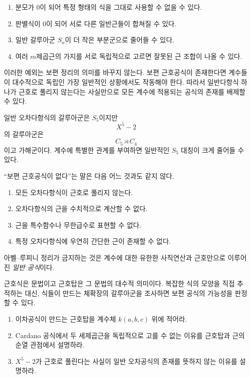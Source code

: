 \begin{enumerate}[label=(\arabic*)]
  \item 분모가 $0$이 되어 특정 형태의 식을 그대로 사용할 수 없을 수 있다.
  \item 판별식이 $0$이 되어 서로 다른 일반근들이 합쳐질 수 있다.
  \item 일반 갈루아군 $S_n$이 더 작은 부분군으로 줄어들 수 있다.
  \item 여러 $m$제곱근의 가지를 서로 독립적으로 고르면 잘못된 근 조합이 나올 수 있다.
\end{enumerate}

이러한 예외는 보편 정리의 의미를 바꾸지 않는다. 보편 근호공식이 존재한다면 계수들이 대수적으로 독립인 가장 일반적인 상황에서도 작동해야 한다. 따라서 일반다항식 하나가 근호로 풀리지 않는다는 사실만으로 모든 계수에 적용되는 공식의 존재를 배제할 수 있다.

\begin{example}
일반 오차다항식의 갈루아군은 $S_5$이지만
\[
  X^5-2
\]
의 갈루아군은
\[
  C_5\rtimes C_4
\]
이고 가해군이다. 계수에 특별한 관계를 부여하면 일반적인 $S_5$ 대칭이 크게 줄어들 수 있다.
\end{example}

\begin{pitfall}
``보편 근호공식이 없다''는 말은 다음 어느 것과도 같지 않다.
\begin{enumerate}[label=(\alph*)]
  \item 모든 오차다항식이 근호로 풀리지 않는다.
  \item 오차다항식의 근을 수치적으로 계산할 수 없다.
  \item 근을 특수함수나 무한급수로 표현할 수 없다.
  \item 특정 오차다항식에 우연히 간단한 근이 존재할 수 없다.
\end{enumerate}
아벨--루피니 정리가 금지하는 것은 계수에 대한 유한한 사칙연산과 근호만으로 이루어진 \emph{일반 공식}이다.
\end{pitfall}

\begin{keyidea}
근호식은 문법이고 근호탑은 그 문법의 대수적 의미이다. 복잡한 식의 모양을 직접 추적하는 대신, 식들이 만드는 체확장의 갈루아군을 조사하면 보편 공식의 가능성을 판정할 수 있다.
\end{keyidea}

\begin{checkpoint}
\begin{enumerate}[label=(\alph*)]
  \item 이차공식이 만드는 근호탑을 계수체 $k(a,b,c)$ 위에 적어라.
  \item Cardano 공식에서 두 세제곱근을 독립적으로 고를 수 없는 이유를 근호탑과 근의 순열 관점에서 설명하라.
  \item $X^5-2$가 근호로 풀린다는 사실이 일반 오차공식의 존재를 뜻하지 않는 이유를 설명하라.
\end{enumerate}
\end{checkpoint}
